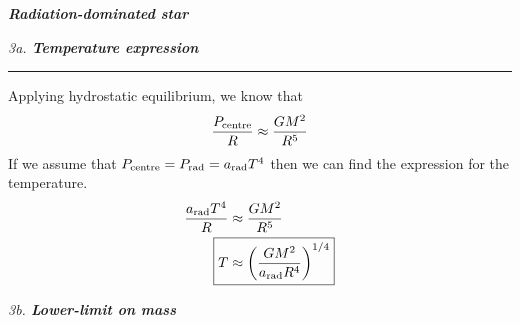 \documentclass[12pt, letterpaper, twoside]{article}
\newcommand{\question}[1]{{\noindent \it #1}}
\newcommand{\answer}[1]{
    \par\noindent\rule{\textwidth}{0.4pt}#1\vspace{0.5cm}
}
\begin{document}
\question{\textbf{Radiation-dominated star}}

\question{3a. \textbf{Temperature expression}}
\answer{
    Applying hydrostatic equilibrium, we know that
    \begin{equation}
        \frac{P_{\rm centre}}{R} \approx \frac{G M^2}{R^5}
    \end{equation}
    If we assume that $P_{\rm centre} = P_{\rm rad} = a_{\rm rad} T^4$ then we can find the expression for the temperature.
    \begin{align}
        \frac{a_{\rm rad} T^4}{R} &\approx \frac{G M^2}{R^5}\\
        \Aboxed{ T &\approx \qty(\frac{G M^2}{a_{\rm rad} R^4})^{1/4} }
    \end{align}
}

\question{3b. \textbf{Lower-limit on mass}}
\end{document}

